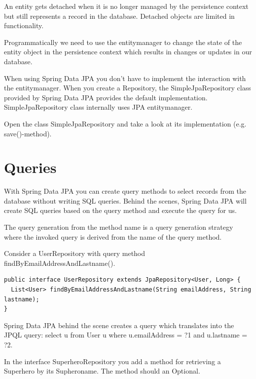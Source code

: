 An entity gets detached when it is no longer managed by the persistence context but still represents a record in the database.
Detached objects are limited in functionality.


 
Programmatically we need to use the entitymanager to change the state of the entity object in the persistence context which results in changes or updates in our database. 

When using Spring Data JPA you don't have to implement the interaction with the entitymanager. When you create a Repository, the SimpleJpaRepository class provided by Spring Data JPA provides the default implementation. SimpleJpaRepository class internally uses JPA entitymanager.

\begin{oefening}
Open the class SimpleJpaRepository and take a look at its implementation (e.g. save()-method).
\end{oefening}


\section{Queries}

With Spring Data JPA you can create query methods to select records from the database without writing SQL queries. Behind the scenes, Spring Data JPA will create SQL queries based on the query method and execute the query for us.

The query generation from the method name is a query generation strategy where the invoked query is derived from the name of the query method.

Consider a UserRepository with query method findByEmailAddressAndLastname().

\begin{lstlisting}
public interface UserRepository extends JpaRepository<User, Long> {
  List<User> findByEmailAddressAndLastname(String emailAddress, String lastname);
}
\end{lstlisting}

Spring Data JPA behind the scene creates a query which translates into the JPQL query: select u from User u where u.emailAddress = ?1 and u.lastname = ?2. 

\begin{oefening}
In the interface SuperheroRepository you add a method for retrieving a Superhero by its Supheroname. The method should an Optional.
\end{oefening}


